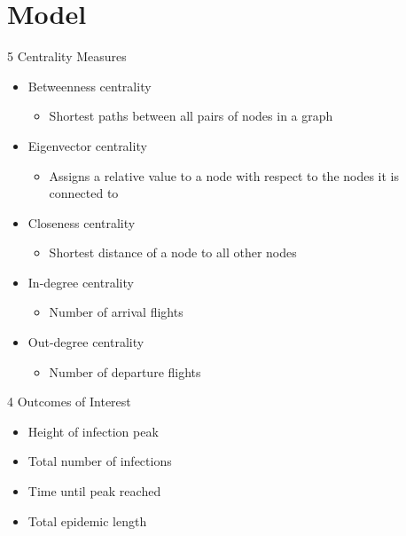 \documentclass[10pt]{beamer}
\begin{document}
\section{Model}
\begin{frame}{5 Centrality Measures}
    \begin{itemize}
        \item Betweenness centrality
        \begin{itemize}
            \item Shortest paths between all pairs of nodes in a graph
        \end{itemize}
            \item Eigenvector centrality
        \begin{itemize}
            \item Assigns a relative value to a node with respect to the nodes it is connected to
        \end{itemize}
        \item Closeness centrality
        \begin{itemize}
            \item Shortest distance of a node to all other nodes
        \end{itemize}
        \item In-degree centrality
        \begin{itemize}
            \item Number of arrival flights
        \end{itemize}
        \item Out-degree centrality
        \begin{itemize}
            \item Number of departure flights
        \end{itemize}
    \end{itemize}
\end{frame}
\begin{frame}{4 Outcomes of Interest}
    \begin{itemize}\itemsep2em
        \item Height of infection peak \\
        \item Total number of infections \\
        \item Time until peak reached \\
        \item Total epidemic length \\
    \end{itemize}
\end{frame}
\end{document}
